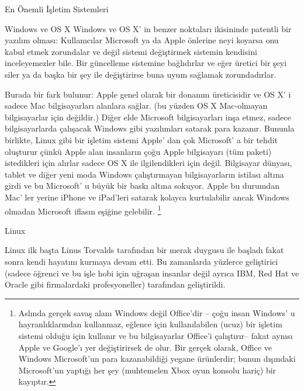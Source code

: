 \documentclass[10pt,a5paper]{book}
\begin{document}
\begin{section}{En Önemli İşletim Sistemleri}
\begin{subsection}{Windows ve OS X}
Windows ve OS X' in benzer noktaları ikisininde patentli bir yazılım olması: Kullanıcılar Microsoft ya da Apple önlerine neyi koyarsa onu kabul etmek zorundalar ve değil sistemi değiştirmek sistemin kendisini inceleyemezler bile. Bir güncelleme sistemine bağlıdırlar ve eğer üretici bir şeyi siler ya da başka bir şey ile değiştirirse buna uyum sağlamak zorundadırlar.

Burada bir fark bulunur: Apple genel olarak bir donanım üreticisidir ve OS X' i sadece Mac bilgisayarları alanlara sağlar. (bu yüzden OS X Mac-olmayan bilgisayarlar için değildir.) Diğer elde Microsoft bilgisayarları inşa etmez, sadece bilgisayarlarda çalışacak Windows gibi yazılımları satarak para kazanır. Bununla birlikte, Linux gibi bir işletim sistemi Apple' dan çok Microsoft' a bir tehdit oluşturur çünkü Apple alan insanların çoğu Apple bilgisayarı (tüm paketi) istedikleri için alırlar sadece OS X ile ilgilendikleri için değil. Bilgisayar dünyası, tablet ve diğer yeni moda Windows çalıştırmayan bilgisayarların istilası altına girdi ve bu Microsoft' u büyük bir baskı altına sokuyor. Apple bu durumdan Mac' ler yerine iPhone ve iPad'leri satarak kolayca kurtulabilir ancak Windows olmadan Microsoft iflasın eşiğine gelebilir.
\footnote{Aslında gerçek savaş alanı Windows değil Office'dir – çoğu insan Windows' u hayranlıklarından kullanmaz, eğlence için kullanılabilen (ucuz) bir işletim sistemi olduğu için kullanır ve bu bilgisayarlar Office'i çalıştırır-- fakat aynısı Apple ve Google'ı yer değiştirirsek de olur. Bir gerçek olarak, Office ve Windows Microsoft'un para kazanabildiği yegane ürünlerdir; bunun dışındaki Microsoft'un yaptığı her şey (muhtemelen Xbox oyun konsolu hariç) bir kayıptır.}
\end{subsection}
\begin{subsection}{Linux}

Linux ilk başta Linus Torvalds tarafından bir merak duygusu ile başladı fakat sonra kendi hayatını kurmaya devam etti. Bu zamanlarda yüzlerce geliştirici (sadece öğrenci ve bu işle hobi için uğraşan insanlar değil ayrıca IBM, Red Hat ve Oracle gibi firmalardaki profesyoneller) tarafından geliştirildi.


\end{subsection}
\end{section}
\end{document}
